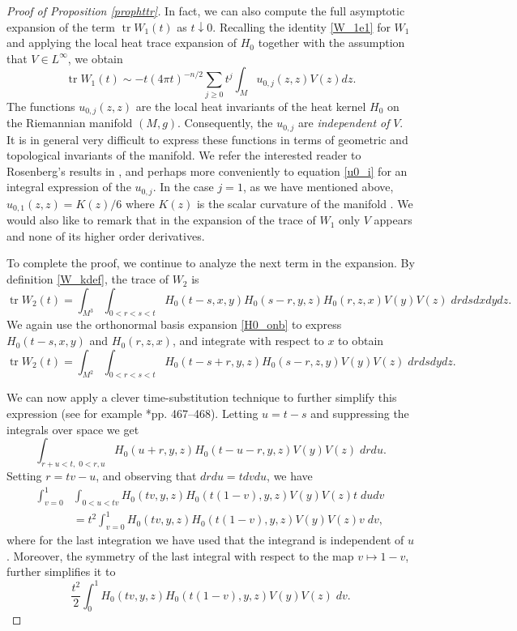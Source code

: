 \documentclass[letterpaper,12pt]{amsart}
\def \eref{\eqref}
\newcommand{\tr}{\mathop{\mathrm{tr}}}
\begin{document}
\begin{proof}[Proof of Proposition \ref{prophttr}]
In fact, we can also compute the full asymptotic expansion of the term $\tr W_1 (t)$ as $t \downarrow 0$. Recalling the identity \eref{W_1e1} for $W_1$ and applying the local heat trace expansion of $H_0$ together with the assumption that $V \in L^\infty$, we obtain
\begin{equation*}
\tr W_1 (t) \sim -t (4\pi t)^{-n/2} \sum_{j \geq 0} t^j \int_M u_{0,j} (z,z) V(z) dz.
\end{equation*}
The functions $u_{0,j}(z,z)$ are the local heat invariants of the heat kernel $H_0$ on the Riemannian manifold $(M, g)$. Consequently, the $u_{0,j}$ are {\it  independent of }  $V$.  It is in general very difficult to express these functions in terms of geometric and topological invariants of the manifold. We refer the interested reader to Rosenberg's results in \cite{Ro}, and perhaps more conveniently to equation \eref{u0_i} for an integral expression of the $u_{0,j}$. In the case $j=1$, as we have mentioned above, $u_{0,1}(z,z)=K(z)/6$ where $K(z)$ is the scalar curvature of the manifold  \cite{Ro}. We would also like to remark that in the expansion of the trace of $W_1$ only $V$ appears and none of its higher order derivatives.

To complete the proof, we continue to analyze the next term in the expansion.
By definition \eref{W_kdef}, the trace of $W_2$ is
$$\tr W_2 (t) = \int_{M^3} \int_{0<r<s<t} H_0(t-s,x,y) H_0(s-r,y,z) H_0(r,z,x) V(y) V(z) \;dr ds dx dy dz.$$
We again use the orthonormal basis expansion \eref{H0_onb} to express $H_0(t-s,x,y)$ and $H_0(r,z,x)$, and integrate with respect to $x$ to obtain
$$\tr W_2 (t) = \int_{M^2} \int_{0<r<s<t} H_0(t-s+r,y,z) H_0(s-r,z,y) V(y) V(z) \; dr ds dy dz.$$


We can now apply a clever time-substitution technique to further simplify this expression (see for example \cite{smith-z}*{pp. 467--468}).  Letting $u=t-s$ and suppressing the integrals over space we get
$$ \int_{r+u<t, \; 0<r,u} H_0(u+r,y, z) H_0(t-u-r,y, z) V(y) V(z) \; dr du.$$
Setting $r=tv-u$, and observing that $dr du = t dv du$,  we have
\begin{equation*}
\begin{split}
\int_{v=0}^1 & \int_{0<u<tv}  H_0 (tv, y, z) H_0 (t(1-v), y, z) V(y) V(z) t \; du dv\\
&= t^2 \int_{v=0}^1 H_0 (tv, y, z) H_0 (t(1-v), y, z) V(y) V(z) v \; dv,
\end{split}
\end{equation*}
where for the last integration we have used that the integrand is independent of $u$. Moreover, the symmetry of the last integral with respect to the map $v \mapsto 1-v$, further simplifies it to
\begin{equation*}
\frac{t^2}{2} \int_0 ^1 H_0 (tv, y, z) H_0 (t(1-v), y, z) V(y) V(z) \;dv.
\end{equation*}



\end{proof}
\end{document}
